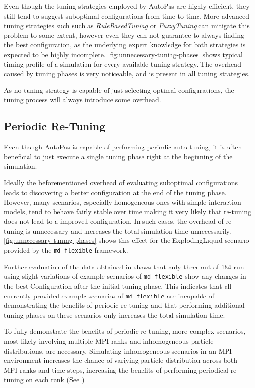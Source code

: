 \documentclass[conference]{IEEEtran}
\begin{document}
Even though the tuning strategies employed by AutoPas are highly efficient, they still tend to suggest suboptimal configurations from time to time. More advanced tuning strategies such such as \textit{RuleBasedTuning} or \textit{FuzzyTuning} can mitigate this problem to some extent, however even they can not guarantee to always finding the best configuration, as the underlying expert knowledge for both strategies is expected to be highly incomplete. \autoref{fig:unnecessary-tuning-phases} shows typical timing profile of a simulation for every available tuning strategy. The overhead caused by tuning phases is very noticeable, and is present in all tuning strategies.

As no tuning strategy is capable of just selecting optimal configurations, the tuning process will always introduce some overhead.

\subsection*{Periodic Re-Tuning}

Even though AutoPas is capable of performing periodic auto-tuning, it is often beneficial to just execute a single tuning phase right at the beginning of the simulation.

Ideally the beforementioned overhead of evaluating suboptimal configurations leads to discovering a better configuration at the end of the tuning phase. However, many scenarios, especially homogeneous ones with simple interaction models, tend to behave fairly stable over time making it very likely that re-tuning does not lead to a improved configuration. In such cases, the overhead of re-tuning is unnecessary and increases the total simulation time unnecessarily. \autoref{fig:unnecessary-tuning-phases} shows this effect for the ExplodingLiquid scenario provided by the \texttt{md-flexible} framework.

Further evaluation of the data obtained in \cite{lerchner2024} shows that only three out of 184 run using slight variations of example scenarios of \texttt{md-flexible} show any changes in the best Configuration after the initial tuning phase. This indicates that all currently provided example scenarios of \texttt{md-flexible} are incapable of demonstrating the benefits of periodic re-tuning and that performing additional tuning phases on these scenarios only increases the total simulation time.

To fully demonstrate the benefits of periodic re-tuning, more complex scenarios, most likely involving multiple MPI ranks and inhomogeneous particle distributions, are necessary. Simulating inhomogeneous scenarios in an MPI environment increases the chance of variying particle distribution across both MPI ranks and time steps, increasing the benefits of performing periodical re-tuning on each rank (See \cite{Newcome2023Poster}).
\end{document}

